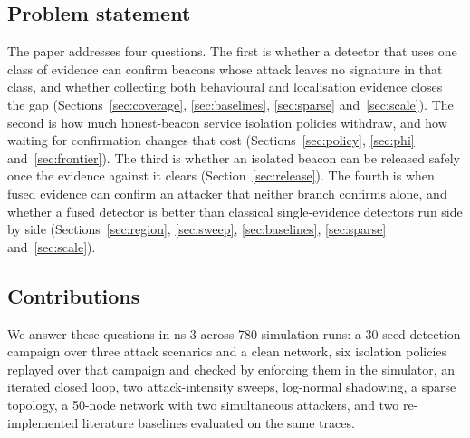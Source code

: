 \documentclass[pdflatex,sn-mathphys-num]{sn-jnl}%
\theoremstyle{thmstyleone}%
\theoremstyle{thmstyletwo}%
\theoremstyle{thmstylethree}%
\begin{document}
\subsection{Problem statement}

The paper addresses four questions. The first is whether a detector that
uses one class of evidence can confirm beacons whose attack leaves no
signature in that class, and whether collecting both behavioural and
localisation evidence closes the gap (Sections~\ref{sec:coverage},
\ref{sec:baselines}, \ref{sec:sparse} and~\ref{sec:scale}). The second is how
much honest-beacon service isolation policies withdraw, and how waiting for
confirmation changes that cost (Sections~\ref{sec:policy}, \ref{sec:phi}
and~\ref{sec:frontier}). The third is whether an isolated beacon can be released
safely once the evidence against it clears (Section~\ref{sec:release}). The
fourth is when fused evidence can confirm an attacker that neither branch
confirms alone, and whether a fused detector is better than classical
single-evidence detectors run side by side (Sections~\ref{sec:region},
\ref{sec:sweep}, \ref{sec:baselines}, \ref{sec:sparse} and~\ref{sec:scale}).

\subsection{Contributions}

We answer these questions in ns-3 across 780 simulation runs: a 30-seed
detection campaign over three attack scenarios and a clean network, six
isolation policies replayed over that campaign and checked by enforcing them
in the simulator, an iterated closed loop, two attack-intensity sweeps,
log-normal shadowing, a sparse topology, a 50-node network with two
simultaneous attackers, and two re-implemented literature baselines evaluated
on the same traces.
\end{document}
